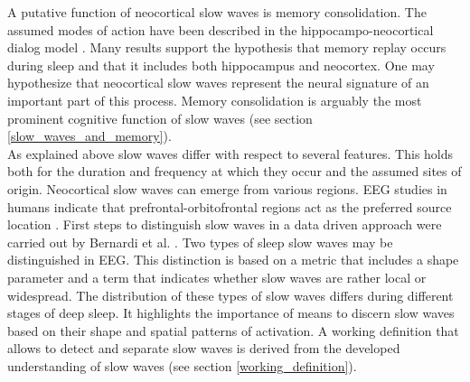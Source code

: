 A putative function of neocortical slow waves is memory consolidation. The assumed modes of action have been described in the hippocampo-neocortical dialog model \parencite{buzsaki1996hippocampo}. Many results support the hypothesis that memory replay occurs during sleep and that it includes both hippocampus and neocortex. One may hypothesize that neocortical slow waves represent the neural signature of an important part of this process. Memory consolidation is arguably the most prominent cognitive function of slow waves (see section \ref{slow_waves_and_memory}).\\
As explained above slow waves differ with respect to several features. This holds both for the duration and frequency at which they occur and the assumed sites of origin. Neocortical slow waves can emerge from various regions. EEG studies in humans indicate that prefrontal-orbitofrontal regions act as the preferred source location \parencite[p. 1110]{brown2012control}. First steps to distinguish slow waves in a data driven approach were carried out by Bernardi et al. \parencite*{bernardi2018local}. Two types of sleep slow waves may be distinguished in EEG. This distinction is based on a metric that includes a shape parameter and a term that indicates whether slow waves are rather local or widespread. The distribution of these types of slow waves differs during different stages of deep sleep. It highlights the importance of means to discern slow waves based on their shape and spatial patterns of activation. A working definition that allows to detect and separate slow waves is derived from the developed understanding of slow waves (see section \ref{working_definition}).


